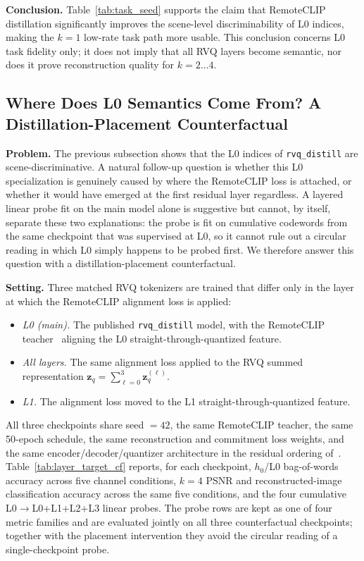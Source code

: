 \documentclass[lettersize,journal]{IEEEtran}
\begin{document}
\textbf{Conclusion.} Table~\ref{tab:task_seed} supports the claim that RemoteCLIP distillation significantly improves the scene-level discriminability of L0 indices, making the $k=1$ low-rate task path more usable. This conclusion concerns L0 task fidelity only; it does not imply that all RVQ layers become semantic, nor does it prove reconstruction quality for $k=2\ldots4$.

\subsection{Where Does L0 Semantics Come From? A Distillation-Placement Counterfactual}
\textbf{Problem.} The previous subsection shows that the L0 indices of \texttt{rvq\_distill} are scene-discriminative. A natural follow-up question is whether this L0 specialization is genuinely caused by where the RemoteCLIP loss is attached, or whether it would have emerged at the first residual layer regardless. A layered linear probe fit on the main model alone is suggestive but cannot, by itself, separate these two explanations: the probe is fit on cumulative codewords from the same checkpoint that was supervised at L0, so it cannot rule out a circular reading in which L0 simply happens to be probed first. We therefore answer this question with a distillation-placement counterfactual.

\textbf{Setting.} Three matched RVQ tokenizers are trained that differ only in the layer at which the RemoteCLIP alignment loss is applied:
\begin{itemize}
    \item \emph{L0 (main).} The published \texttt{rvq\_distill} model, with the RemoteCLIP teacher~\cite{liu2024remoteclip} aligning the L0 straight-through-quantized feature.
    \item \emph{All layers.} The same alignment loss applied to the RVQ summed representation $\mathbf{z}_q = \sum_{\ell=0}^{3}\mathbf{z}_q^{(\ell)}$.
    \item \emph{L1.} The alignment loss moved to the L1 straight-through-quantized feature.
\end{itemize}
All three checkpoints share seed $=42$, the same RemoteCLIP teacher, the same 50-epoch schedule, the same reconstruction and commitment loss weights, and the same encoder/decoder/quantizer architecture in the residual ordering of~\cite{lee2022residual}. Table~\ref{tab:layer_target_cf} reports, for each checkpoint, $h_0$/L0 bag-of-words accuracy across five channel conditions, $k{=}4$ PSNR and reconstructed-image classification accuracy across the same five conditions, and the four cumulative L0$\to$L0+L1+L2+L3 linear probes. The probe rows are kept as one of four metric families and are evaluated jointly on all three counterfactual checkpoints; together with the placement intervention they avoid the circular reading of a single-checkpoint probe.
\end{document}
